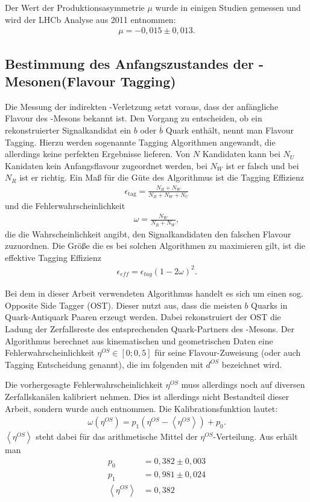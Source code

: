 Der Wert der Produktionsasymmetrie $\mu$ wurde in einigen Studien gemessen und wird der LHCb Analyse aus 2011 \cite{lhcb-paper} entnommen:
\begin{align}
\mu = -0,015 \pm 0,013 .
\end{align}

\subsection{Bestimmung des Anfangszustandes der \Bd-Mesonen(Flavour Tagging)}
Die Messung der indirekten \CP-Verletzung setzt voraus, dass der anfängliche Flavour des \Bd-Mesons bekannt ist. Den Vorgang zu entscheiden, ob ein rekonstruierter Signalkandidat ein $b$ oder $\overline{b}$ Quark enthält, nennt man \glqq Flavour Tagging\grqq. Hierzu werden sogenannte Tagging Algorithmen angewandt, die allerdings keine perfekten Ergebnisse lieferen. Von $N$ Kandidaten kann bei $N_U$ Kanidaten kein Anfangsflavour zugeordnet werden, bei $N_W$ ist er falsch und bei $N_R$ ist er richtig. Ein Maß für die Güte des Algorithmus ist die Tagging Effizienz
\begin{align}
\epsilon_{\text{tag}} = \frac{N_R+N_W}{N_R+N_W+N_U}
\end{align}
und die Fehlerwahrscheinlichkeit
\begin{align}
\omega = \frac{N_W}{N_R+N_W},
\end{align}
die die Wahrscheinlichkeit angibt, den Signalkandidaten den falschen Flavour zuzuordnen. Die Größe die es bei solchen Algorithmen zu maximieren gilt, ist die effektive Tagging Effizienz
\begin{align}
\epsilon_{eff} = \epsilon_{tag}(1-2\omega)^2.
\end{align}

Bei dem in dieser Arbeit verwendeten Algorithmus handelt es sich um einen sog. Opposite Side Tagger (OST). Dieser nutzt aus, dass die meisten $b$ Quarks in Quark-Antiquark Paaren erzeugt werden. Dabei rekonstruiert der OST die Ladung der Zerfallsreste des entsprechenden Quark-Partners des \Bd-Mesons. Der Algorithmus berechnet aus kinematischen und geometrischen Daten eine Fehlerwahrscheinlichkeit $\eta^{OS} \in [0;0,5]$ für seine Flavour-Zuweisung (oder auch Tagging Entscheidung genannt), die im folgenden mit $d^{OS}$ bezeichnet wird. \cite{lhcb-paper}

Die vorhergesagte Fehlerwahrscheinlichkeit $\eta^{OS}$ muss allerdings noch auf diversen Zerfallskanälen kalibriert nehmen. Dies ist allerdings nicht Bestandteil dieser Arbeit, sondern wurde auch \cite{tagging} entnommen. Die Kalibrationsfunktion lautet:
\begin{align}
\omega(\eta^{OS}) = p_1\left(\eta^{OS}-\left\langle \eta^{OS} \right\rangle\right) + p_0 .
\end{align}
$\left\langle \eta^{OS} \right\rangle$ steht dabei für das arithmetische Mittel der $\eta^{OS}$-Verteilung. Aus \cite{tagging} erhält man
\begin{align}
p_0 &= 0,382 \pm 0,003 \\
p_1 &= 0,981 \pm 0,024 \\
\left\langle \eta^{OS} \right\rangle &= 0,382
\end{align}

